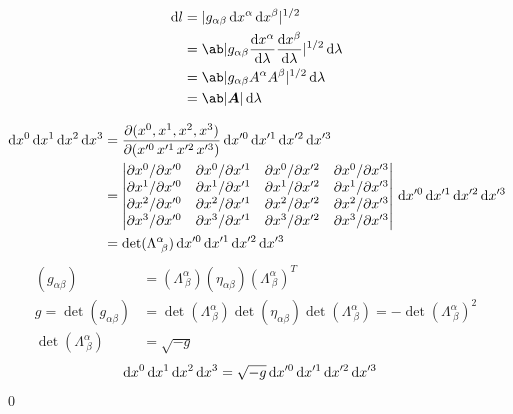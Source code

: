 \documentclass[uplatex,dvipdfmx,a4paper,11pt]{jlreq}
\makeatletter
\renewcommand{\AA}{\bm{A}}
\theoremstyle{definition}
\renewenvironment{proof}[1][\proofname]{\par
  \normalfont
  \topsep6\p@\@plus6\p@ \trivlist
  \item[\hskip\labelsep{\bfseries #1}\@addpunct{\bfseries}]\ignorespaces\quad\par
}{%
  \qed\endtrivlist\@endpefalse
}
\renewcommand\proofname{証明}
\makeatother
\begin{document}
\begin{proof}
  \begin{align}
    \dl{l} & = |g_{\alpha\beta}\dl{x^\alpha}\dl{x^\beta}|^{1/2}                                      \\
           & = \ab|g_{\alpha\beta}\diff{x^\alpha}{\lambda}\diff{x^\beta}{\lambda}|^{1/2}\dl{\lambda} \\
           & = \ab|g_{\alpha\beta}A^\alpha A^\beta|^{1/2}\dl{\lambda}                                \\
           & = \ab|\AA|\dl{\lambda}                                                                  \\
  \end{align}

  \begin{align}
    \dl{x^0}\dl{x^1}\dl{x^2}\dl{x^3} & = \diffp{(x^0, x^1, x^2, x^3)}{(x'^0\, x'^1\, x'^2\, x'^3)}\dl{x'^0}\dl{x'^1}\dl{x'^2}\dl{x'^3}                     \\
                                     & = \begin{vmatrix}
                                           \partial x^0/\partial x'^0 & \partial x^0/\partial x'^1 & \partial x^0/\partial x'^2 & \partial x^0/\partial x'^3 \\
                                           \partial x^1/\partial x'^0 & \partial x^1/\partial x'^1 & \partial x^1/\partial x'^2 & \partial x^1/\partial x'^3 \\
                                           \partial x^2/\partial x'^0 & \partial x^2/\partial x'^1 & \partial x^2/\partial x'^2 & \partial x^2/\partial x'^3 \\
                                           \partial x^3/\partial x'^0 & \partial x^3/\partial x'^1 & \partial x^3/\partial x'^2 & \partial x^3/\partial x'^3 \\
                                         \end{vmatrix}\dl{x'^0}\dl{x'^1}\dl{x'^2}\dl{x'^3} \\
                                     & = \det(\Lambda^\alpha_{\ \beta})\dl{x'^0}\dl{x'^1}\dl{x'^2}\dl{x'^3}
  \end{align}
  \begin{align}
    (g_{\alpha\beta})              & = (\Lambda^\alpha_{\ \beta})(\eta_{\alpha\beta})(\Lambda^\alpha_{\ \beta})^T                                               \\
    g = \det(g_{\alpha\beta})      & = \det(\Lambda^\alpha_{\ \beta})\det(\eta_{\alpha\beta})\det(\Lambda^\alpha_{\ \beta}) = -\det(\Lambda^\alpha_{\ \beta})^2 \\
    \det(\Lambda^\alpha_{\ \beta}) & = \sqrt{-g}
  \end{align}
  \begin{align}
    \dl{x^0}\dl{x^1}\dl{x^2}\dl{x^3} & = \sqrt{-g}\dl{x'^0}\dl{x'^1}\dl{x'^2}\dl{x'^3}
  \end{align}
\end{proof}
\end{document}
